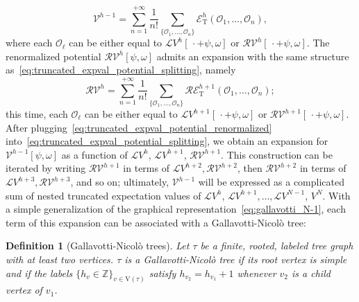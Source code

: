\documentclass[a4paper, 11pt]{article}
\newcommand{\Z}{\mathbb{Z}}									%
\newcommand{\sing}[2]{{#1}^{#2}}							%
\newcommand{\loc}{\mathcal{L}}								%
\newcommand{\ren}{\mathcal{R}}								%
\newcommand{\vrt}{\mathrm{V}}								%
\newcommand{\TExp}[1]{\mathcal{E}^{#1}_%
{\scriptscriptstyle{\mathrm{T}}}}							%
\theoremstyle{thm}
\newtheorem{defn}{Definition}
\begin{document}
\begin{equation}
\label{eq:truncated_expval_potential_splitting}
\sing{\mathscr{V}}{h-1} = \sum_{n = 1}^{+\infty} \frac{1}{n!} \sum_{\lbrace \mathscr{O}_1, \dots, \mathscr{O}_n \rbrace} \TExp{h}(\mathscr{O}_1, \dots, \mathscr{O}_n),
\end{equation}
where each $\mathscr{O}_\ell$ can be either equal to $\loc \sing{V}{h}[\, \cdot + \psi, \omega]$ or $\ren \sing{\mathscr{V}}{h}[\, \cdot + \psi, \omega]$. The renormalized potential $\ren \sing{\mathscr{V}}{h}[\psi, \omega]$ admits an expansion with the same structure as~\eqref{eq:truncated_expval_potential_splitting}, namely
\begin{equation}
\label{eq:truncated_expval_potential_renormalized}
\ren \sing{\mathscr{V}}{h} = \sum_{n = 1}^{+\infty} \frac{1}{n!} \sum_{\lbrace \mathscr{O}_1, \dots, \mathscr{O}_n \rbrace} \ren \TExp{h+1}(\mathscr{O}_1, \dots, \mathscr{O}_n);
\end{equation}
this time, each $\mathscr{O}_\ell$ can be either equal to $\loc \sing{V}{h+1}[\, \cdot + \psi, \omega]$ or $\ren \sing{\mathscr{V}}{h+1}[\, \cdot + \psi, \omega]$. After plugging~\eqref{eq:truncated_expval_potential_renormalized} into~\eqref{eq:truncated_expval_potential_splitting}, we obtain an expansion for $\sing{\mathscr{V}}{h-1}[\psi, \omega]$ as a function of $\loc \sing{V}{h}$, $\loc \sing{V}{h+1}$, $\ren \sing{\mathscr{V}}{h+1}$. This construction can be iterated by writing $\ren \sing{\mathscr{V}}{h+1}$ in terms of $\loc \sing{V}{h+2}, \ren \sing{\mathscr{V}}{h+2}$, then $\ren \sing{\mathscr{V}}{h+2}$ in terms of $\loc \sing{V}{h+3}, \ren \sing{\mathscr{V}}{h+3}$, and so on; ultimately, $\sing{\mathscr{V}}{h-1}$ will be expressed as a complicated sum of nested truncated expectation values of $\loc \sing{V}{h}$, $\loc \sing{V}{h+1}, \dots, \loc \sing{V}{N-1}$, $\sing{V}{N}$. With a simple generalization of the graphical representation~\eqref{eq:gallavotti_N-1}, each term of this expansion can be associated with a Gallavotti-Nicolò tree:
\begin{defn}[Gallavotti-Nicolò trees]
\label{def:trees}
Let $\tau$ be a finite, rooted, labeled tree graph with at least two vertices. $\tau$ is a Gallavotti-Nicolò tree if its root vertex is simple and if the labels $\lbrace h_v \in \Z \rbrace_{v \in \vrt(\tau)}$ satisfy $h_{v_2} = h_{v_1} + 1$ whenever $v_2$ is a child vertex of $v_1$.
\end{defn}
\end{document}
